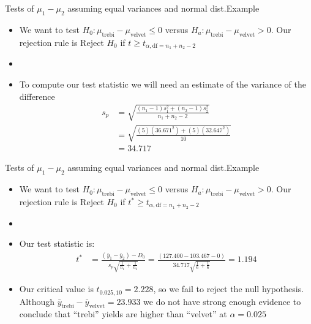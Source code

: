 \documentclass[xcolor=dvipsnames]{beamer}
\begin{document}
\begin{frame}{Tests of $\mu_1 - \mu_2$ assuming equal variances and normal dist.}{Example}
\begin{itemize}
	\item We want to test $H_0: \mu_{\text{trebi}} - \mu_{\text{velvet}} \leq 0$ versus $H_a: \mu_{\text{trebi}} - \mu_{\text{velvet}} > 0$. Our rejection rule is Reject $H_0$ if $t \geq t_{\alpha, \text{df} = n_1 + n_2 -2}$ \pause
	\item[]
	\item To compute our test statistic we will need an estimate of the variance of the difference \pause
	\begin{align*}
		s_p &= \sqrt{\frac{(n_1 -1)s_1^2 + (n_2-1)s_2^2}{n_1 + n_2 -2}} \\
		&= \sqrt{\frac{(5)(36.671^2) + (5)(32.647^2)}{10}} \\
		&= 34.717
	\end{align*}
\end{itemize}
\end{frame}

\begin{frame}{Tests of $\mu_1 - \mu_2$ assuming equal variances and normal dist.}{Example}
\begin{itemize}
	\item We want to test $H_0: \mu_{\text{trebi}} - \mu_{\text{velvet}} \leq 0$ versus $H_a: \mu_{\text{trebi}} - \mu_{\text{velvet}} > 0$. Our rejection rule is Reject $H_0$ if $t^* \geq t_{\alpha, \text{df} = n_1 + n_2 -2}$
	\item[]
	\item Our test statistic is:
	\begin{align*}
	t^* &= \frac{(\bar{y}_1-\bar{y}_2) - D_0}{s_p \sqrt{\frac{1}{n_1} + \frac{1}{n_2}}} = \frac{(127.400 - 103.467 - 0)}{34.717 \sqrt{\frac{1}{6}+\frac{1}{6}}} = 1.194
	\end{align*}\pause
	\item Our critical value is $t_{0.025,10} = 2.228$, so we fail to reject the null hypothesis. Although $\bar{y}_{\text{trebi}} - \bar{y}_{\text{velvet}} = 23.933$ we do not have strong enough evidence to conclude that ``trebi'' yields are higher than ``velvet'' at $\alpha = 0.025$
\end{itemize}
\end{frame}
\end{document}
